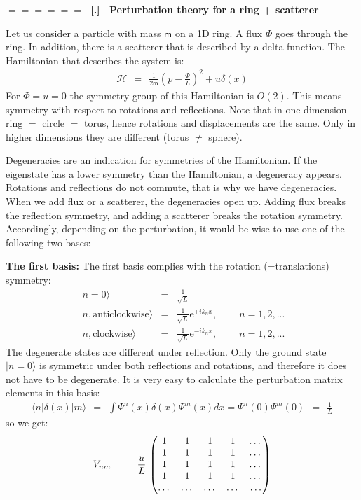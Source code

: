 \documentclass[onecolumn,fleqn]{revtex4}
\newcommand{\eexp}{\mathrm{e}^}
\newcommand{\mass}{\mathsf{m}}
\newcommand{\amatrix}[1]{\begin{matrix} #1 \end{matrix}}
\newcommand{\beq}{\begin{eqnarray}}
\newcommand{\eeq}{\end{eqnarray}}
\renewcommand{\thesubsection}{\arabic{subsection}}
\renewcommand{\thesubsubsection}{\arabic{subsubsection}}
\newcommand{\sheadC}[1]
{
\addtocounter{subsubsection}{1}
\vspace{5mm}
{\Large\bf $=\!=\!=\!=\!=\!=\;$ [\thesubsection.\thesubsubsection] \ #1}  
\nopagebreak
\phantomsection
}
\begin{document}
\sheadC{Perturbation theory for a ring + scatterer}

Let us consider a particle with mass $\mass$ 
on a 1D ring. A flux ${\Phi}$ goes through the ring. 
In addition, there is a scatterer that is described 
by a delta function. The Hamiltonian that 
describes the system is:
\beq
\mathcal{H} \ \ = \ \ \frac{1}{2\mass}\left(p-\frac{\Phi}{L}\right)^2 +u\delta(x) 
\eeq
For $\Phi=u=0$  the symmetry group of this Hamiltonian is ${O(2)}$. 
This means symmetry with respect to rotations and reflections. 
Note that in one-dimension ring $=$ circle $=$ torus, 
hence rotations and displacements are the same. 
Only in higher dimensions they are different (torus ${\ne}$ sphere). 

Degeneracies are an indication for symmetries of the 
Hamiltonian. If the eigenstate has a lower symmetry 
than the Hamiltonian, a degeneracy appears. Rotations 
and reflections do not commute, that is why we have degeneracies. 
When we add flux or a scatterer, the degeneracies open up. 
Adding flux breaks the reflection symmetry, 
and adding a scatterer breaks the rotation symmetry. 
Accordingly, depending on the perturbation, 
it would be wise to use one of the following two bases:



{\bf The first basis:} 
The first basis complies with the rotation (=translations) symmetry:
\beq
|n=0\rangle &=& \frac{1}{\sqrt{L}}
\\ \nonumber
| n, \mbox{anticlockwise} \rangle &=& \frac{1}{\sqrt{L}} \eexp{+ik_n x}, \ \ \ \ \ \ \ \ \ \ n=1,2,...
\\ \nonumber
|n,\mbox{clockwise} \rangle &=& \frac{1}{\sqrt{L}} \eexp{-ik_n x}, \ \ \ \ \ \ \ \ \ \ n=1,2,...
\eeq
The degenerate states are different under reflection. 
Only the ground state ${|n=0\rangle}$ is symmetric
under both reflections and rotations, and therefore it 
does not have to be degenerate. 
It is very easy to calculate the perturbation matrix 
elements in this basis:
\beq
\langle n |\delta(x)|m \rangle 
\ \ = \ \  \int\Psi^n(x)\delta(x)\Psi^m(x)dx = \Psi^n(0)\Psi^m(0) 
\ \ = \ \ \frac{1}{L} 
\eeq
so we get:
\beq
V_{nm} \ \ = \ \ \frac{u}{L} \, 
\left(
\amatrix{
1 & 1 & 1 & 1 & \dots \cr 
1 &1& 1 &1 & \dots \cr
1 & 1 & 1 & 1 & \dots \cr 
1 & 1 & 1 & 1 & \dots \cr 
\dots & \dots & \dots & \dots & \dots } 
\right)  
\eeq
\end{document}
